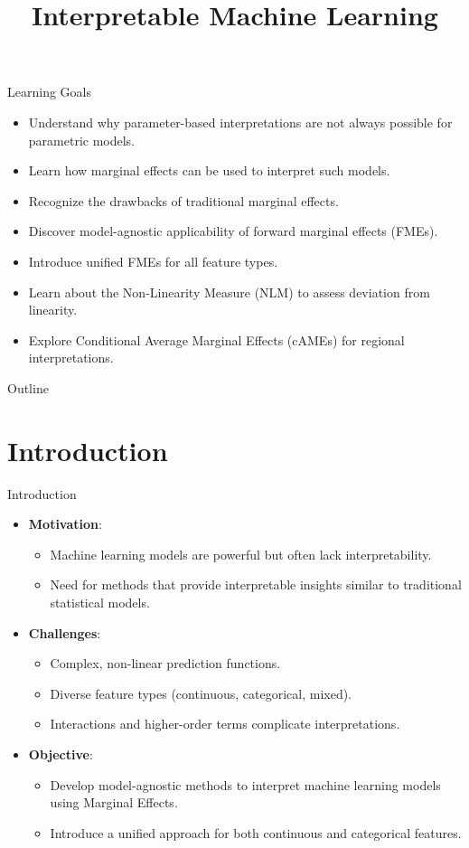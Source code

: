 \documentclass[11pt,compress,t,notes=noshow, aspectratio=169, xcolor=table]{beamer}
\title{Interpretable Machine Learning}
\date{}
\begin{document}
\begin{frame}
  \titlepage
\end{frame}

\begin{frame}{Learning Goals}
\begin{itemize}
\item Understand why parameter-based interpretations are not always possible for parametric models.
\item Learn how marginal effects can be used to interpret such models.
\item Recognize the drawbacks of traditional marginal effects.
\item Discover model-agnostic applicability of forward marginal effects (FMEs).
\item Introduce unified FMEs for all feature types.
\item Learn about the Non-Linearity Measure (NLM) to assess deviation from linearity.
\item Explore Conditional Average Marginal Effects (cAMEs) for regional interpretations.
\end{itemize}
\end{frame}

\begin{frame}{Outline}
\tableofcontents
\end{frame}

\section{Introduction}

\begin{frame}{Introduction}
\begin{itemize}
\item \textbf{Motivation}:
\begin{itemize}
  \item Machine learning models are powerful but often lack interpretability.
  \item Need for methods that provide interpretable insights similar to traditional statistical models.
\end{itemize}
\item \textbf{Challenges}:
\begin{itemize}
  \item Complex, non-linear prediction functions.
  \item Diverse feature types (continuous, categorical, mixed).
  \item Interactions and higher-order terms complicate interpretations.
\end{itemize}
\item \textbf{Objective}:
\begin{itemize}
  \item Develop model-agnostic methods to interpret machine learning models using Marginal Effects.
  \item Introduce a unified approach for both continuous and categorical features.
\end{itemize}
\end{itemize}
\end{frame}
\end{document}
